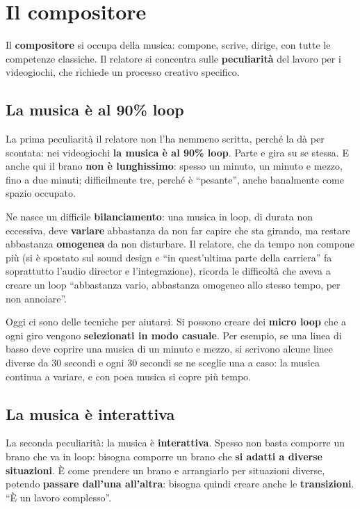 \section{Il compositore}
\label{z9:sec:compositore}

Il \textbf{compositore} si occupa della musica: compone, scrive, dirige, con
tutte le competenze classiche. Il relatore si concentra sulle
\textbf{peculiarità} del lavoro per i videogiochi, che richiede un processo
creativo specifico.

\subsection{La musica è al 90\% loop}

La prima peculiarità il relatore non l'ha nemmeno scritta, perché la dà per
scontata: nei videogiochi \textbf{la musica è al 90\% loop}. Parte e gira su se
stessa. E anche qui il brano \textbf{non è lunghissimo}: spesso un minuto, un
minuto e mezzo, fino a due minuti; difficilmente tre, perché è ``pesante'', anche
banalmente come spazio occupato.

Ne nasce un difficile \textbf{bilanciamento}: una musica in loop, di durata non
eccessiva, deve \textbf{variare} abbastanza da non far capire che sta girando, ma
restare abbastanza \textbf{omogenea} da non disturbare. Il relatore, che da
tempo non compone più (si è spostato sul sound design e ``in quest'ultima parte
della carriera'' fa soprattutto l'audio director e l'integrazione), ricorda le
difficoltà che aveva a creare un loop ``abbastanza vario, abbastanza omogeneo
allo stesso tempo, per non annoiare''.

Oggi ci sono delle tecniche per aiutarsi. Si possono creare dei \textbf{micro
loop} che a ogni giro vengono \textbf{selezionati in modo casuale}. Per esempio,
se una linea di basso deve coprire una musica di un minuto e mezzo, si scrivono
alcune linee diverse da 30 secondi e ogni 30 secondi se ne sceglie una a caso:
la musica continua a variare, e con poca musica si copre più tempo.

\subsection{La musica è interattiva}

La seconda peculiarità: la musica è \textbf{interattiva}. Spesso non basta
comporre un brano che va in loop: bisogna comporre un brano che \textbf{si adatti
a diverse situazioni}. È come prendere un brano e arrangiarlo per situazioni
diverse, potendo \textbf{passare dall'una all'altra}: bisogna quindi creare
anche le \textbf{transizioni}. ``È un lavoro complesso''.

